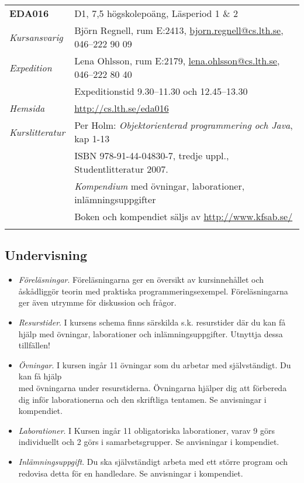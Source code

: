 \begin{longtable}[c]{@{}ll@{}}
\toprule\addlinespace
\textbf{EDA016} & D1, 7,5 högskolepoäng, Läsperiod 1 \& 2
\\\addlinespace
\midrule\endhead
\emph{Kursansvarig} & Björn Regnell, rum E:2413,
\href{mailto:bjorn.regnell@cs.lth.se}{bjorn.regnell@cs.lth.se}, 046--222
90 09
\\\addlinespace
\emph{Expedition} & Lena Ohlsson, rum E:2179,
\href{mailto:lena.ohlsson@cs.lth.se}{lena.ohlsson@cs.lth.se}, 046--222
80 40
\\\addlinespace
& Expeditionstid 9.30--11.30 och 12.45--13.30
\\\addlinespace
\emph{Hemsida} & \url{http://cs.lth.se/eda016}
\\\addlinespace
\emph{Kurslitteratur} & Per Holm: \emph{Objektorienterad programmering
och Java}, kap 1-13
\\\addlinespace
& ISBN 978-91-44-04830-7, tredje uppl., Studentlitteratur 2007.
\\\addlinespace
& \emph{Kompendium} med övningar, laborationer, inlämningsuppgifter
\\\addlinespace
& Boken och kompendiet säljs av \url{http://www.kfsab.se/}
\\\addlinespace
\bottomrule
\end{longtable}

\subsection{Undervisning}\label{undervisning}

\begin{itemize}
\item
  \emph{Föreläsningar}. Föreläsningarna ger en översikt av
  kursinnehållet och åskådliggör teorin med praktiska
  programmeringsexempel. Föreläsningarna ger även utrymme för diskussion
  och frågor.
\item
  \emph{Resurstider}. I kursens schema finns särskilda s.k. resurstider
  där du kan få hjälp med övningar, laborationer och
  inlämningsuppgifter. Utnyttja dessa tillfällen!
\item
  \emph{Övningar}. I kursen ingår 11 övningar som du arbetar med
  självständigt. Du kan få hjälp\\med övningarna under resurstiderna.
  Övningarna hjälper dig att förbereda dig inför laborationerna och den
  skriftliga tentamen. Se anvisningar i kompendiet.
\item
  \emph{Laborationer}. I Kursen ingår 11 obligatoriska laborationer,
  varav 9 görs individuellt och 2 görs i samarbetsgrupper. Se
  anvisningar i kompendiet.
\item
  \emph{Inlämningsuppgift}. Du ska självständigt arbeta med ett större
  program och redovisa detta för en handledare. Se anvisningar i
  kompendiet.
\end{itemize}


